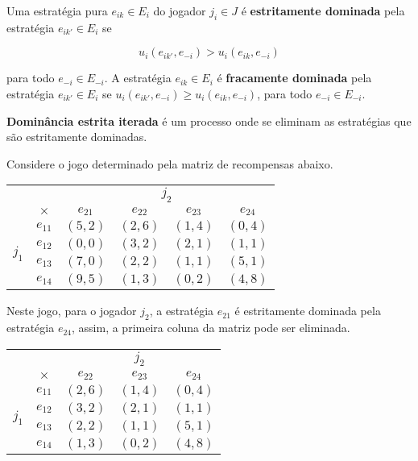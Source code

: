 Uma estratégia pura $e_{ik} \in E_i$ do jogador $j_i \in J$ é \textbf{estritamente dominada} pela estratégia $e_{ik'} \in E_i$ se 

$$u_i\left(e_{ik'}, e_{-i}\right) > u_i\left(e_{ik}, e_{-i}\right)$$\vspace{0.1cm}

para todo $e_{-i} \in E_{-i}$. A estratégia $e_{ik} \in E_i$ é \textbf{fracamente dominada} pela estratégia $e_{ik'} \in E_i$ se $u_i\left(e_{ik'} , e_{-i}\right) \geq u_i\left(e_{ik}, e_{-i}\right)$, para todo $e_{-i} \in E_{-i}$.

\textbf{Dominância estrita iterada} é um processo onde se eliminam as estratégias que são estritamente dominadas.

\begin{ex}\label{tab} Considere o jogo determinado pela matriz de recompensas abaixo.

\begin{center}
\begin{tabular}[H]{c|c|c|c|c|c|}
\multicolumn{2}{c}{} & \multicolumn{4}{c}{$j_2$} \\\cline{2-6}
& $\times$ & $e_{21}$ & $e_{22}$ & $e_{23}$ & $e_{24}$\\\cline{2-6}
\multirow{4}{*}{$j_1$} & $e_{11}$ & $(5,2)$ & $(2,6)$ & $(1,4)$ & $(0,4)$ \\\cline{2-6}
& $e_{12}$ & $(0,0)$ & $(3,2)$ & $(2,1)$ & $(1,1)$ \\\cline{2-6}
& $e_{13}$ & $(7,0)$ & $(2,2)$ & $(1,1)$ & $(5,1)$ \\\cline{2-6}
& $e_{14}$ & $(9,5)$ & $(1,3)$ & $(0,2)$ & $(4,8)$ \\\cline{2-6}
\end{tabular}
\end{center}\vspace{1cm}

Neste jogo, para o jogador $j_2$, a estratégia $e_{21}$ é estritamente dominada pela estratégia $e_{24}$, assim, a primeira coluna da matriz pode ser eliminada.

\begin{center}
\begin{tabular}[H]{c|c|c|c|c|}
\multicolumn{2}{c}{} & \multicolumn{3}{c}{$j_2$} \\\cline{2-5}
& $\times$ & $e_{22}$ & $e_{23}$ & $e_{24}$\\\cline{2-5}
\multirow{4}{*}{$j_1$} & $e_{11}$ & $(2,6)$ & $(1,4)$ & $(0,4)$ \\\cline{2-5}
& $e_{12}$ & $(3,2)$ & $(2,1)$ & $(1,1)$ \\\cline{2-5}
& $e_{13}$ & $(2,2)$ & $(1,1)$ & $(5,1)$ \\\cline{2-5}
& $e_{14}$ & $(1,3)$ & $(0,2)$ & $(4,8)$ \\\cline{2-5}
\end{tabular}
\end{center}\vspace{1cm}


\end{ex}
